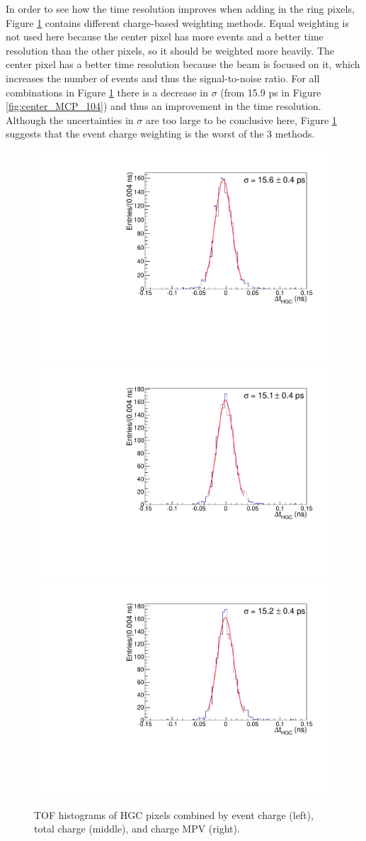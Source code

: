 \documentclass[twocolumn,aps,prd,reprint,superscriptaddress,floatfix]{revtex4-1}
\begin{document}
In order to see how the time resolution improves when adding in the ring pixels, Figure \ref{fig:HGC_event_total_MPV_104} contains different charge-based weighting methods. 
Equal weighting is not used here because the center pixel has more events and a better time resolution than the other pixels, so it should be weighted more heavily. 
The center pixel has a better time resolution because the beam is focused on it, which increases the number of events and thus the signal-to-noise ratio. 
For all combinations in Figure \ref{fig:HGC_event_total_MPV_104} there is a decrease in $\sigma$ (from 15.9 ps in Figure \ref{fig:center_MCP_104}) and thus an improvement in the time resolution. 
Although the uncertainties in $\sigma$ are too large to be conclusive here, Figure \ref{fig:HGC_event_total_MPV_104} suggests that the event charge weighting is the worst of the 3 methods.

\begin{figure}[p]
\centering
	\includegraphics[width=.32\textwidth]{deltaTPicoSilEventCharge104.pdf}
	\includegraphics[width=.32\textwidth]{deltaTPicoSilTotalCharge104.pdf}
	\includegraphics[width=.32\textwidth]{deltaTPicoSilLandauCharge104.pdf}
	\caption{TOF histograms of HGC pixels combined by event charge (left), total charge (middle), and charge MPV (right).}
	\label{fig:HGC_event_total_MPV_104}
\end{figure}
\end{document}

